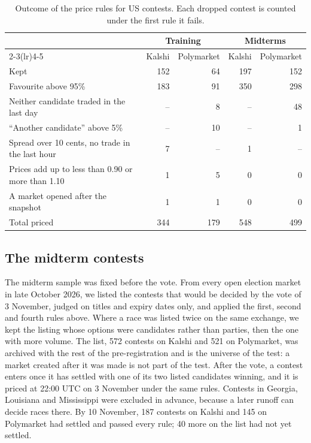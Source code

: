 \begin{table}[t]
\centering
\caption{Outcome of the price rules for US contests. Each dropped contest is counted under the first rule it
fails.}\label{tab:rules}
\small
\begin{tabular}{lrrrr}
\toprule
 & \multicolumn{2}{c}{Training} & \multicolumn{2}{c}{Midterms} \\
\cmidrule(lr){2-3}\cmidrule(lr){4-5}
 & Kalshi & Polymarket & Kalshi & Polymarket \\
\midrule
Kept & 152 & 64 & 197 & 152 \\
Favourite above 95\% & 183 & 91 & 350 & 298 \\
Neither candidate traded in the last day & -- & 8 & -- & 48 \\
``Another candidate'' above 5\% & -- & 10 & -- & 1 \\
Spread over 10 cents, no trade in the last hour & 7 & -- & 1 & -- \\
Prices add up to less than 0.90 or more than 1.10 & 1 & 5 & 0 & 0 \\
A market opened after the snapshot & 1 & 1 & 0 & 0 \\
\midrule
Total priced & 344 & 179 & 548 & 499 \\
\bottomrule
\end{tabular}
\end{table}

\subsection{The midterm contests}

The midterm sample was fixed before the vote. From every open election market in late October 2026, we listed the
contests that would be decided by the vote of 3 November, judged on titles and expiry dates only, and applied the
first, second and fourth rules above. Where a race was listed twice on the same exchange, we kept the listing whose
options were candidates rather than parties, then the one with more volume. The list, 572 contests on Kalshi and 521
on Polymarket, was archived with the rest of the pre-registration and is the universe of the test: a market created
after it was made is not part of the test. After the vote, a contest enters once it has settled with one of its two
listed candidates winning, and it is priced at 22:00 UTC on 3 November under the same rules. Contests in Georgia,
Louisiana and Mississippi were excluded in advance, because a later runoff can decide races there. By 10 November, 187
contests on Kalshi and 145 on Polymarket had settled and passed every rule; 40 more on the list had not yet settled.

